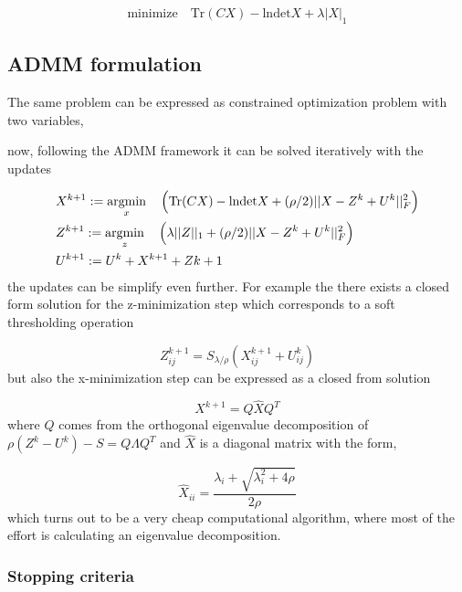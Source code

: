 \begin{equation}
\mbox{minimize}\quad \textrm{Tr}(CX)-\textrm{lndet} X+ \lambda |X|_1
\end{equation}

\subsection{ADMM formulation}

The same problem can be expressed as constrained optimization problem with two variables,

now, following the ADMM framework it can be solved iteratively with the updates

\begin{align*}
&X^{k+1} := \operatorname*{argmin}_x \quad\Big(\textrm{Tr}(CX)-\textrm{lndet}X+(\rho/2)||X-Z^k+U^k||_F^2\Big)\\
&Z^{k+1} := \operatorname*{argmin}_z\quad \Big(\lambda||Z||_1+(\rho/2)||X-Z^k+U^k||_F^2\Big)\\
&U^{k+1} := U^k + X^{k+1}+Z{k+1}
\end{align*}
the updates can be simplify even further. For example the there exists a closed form solution for the z-minimization step which corresponds to a soft thresholding operation \cite[p.~23]{convexanalysis}

\begin{equation*}
	Z_{ij}^{k+1} = S_{\lambda/\rho}(X^{k+1}_{ij}+U^k_{ij})
\end{equation*}
but also the x-minimization step can be expressed as a closed from solution \cite[p.~47]{ADMM}

\begin{equation*}
X^{k+1} = Q\hat{X}Q^T
\end{equation*}
where $Q$ comes from the orthogonal eigenvalue decomposition of $\rho(Z^k-U^k)-S=Q\Lambda Q^T$ and $\hat{X}$ is a diagonal matrix with the form,

\begin{equation*}
	\hat{X}_{ii} = \frac{\lambda_i+\sqrt{\lambda_i^2+4\rho}}{2\rho}
\end{equation*}
which turns out to be a very cheap computational algorithm, where most of the effort is calculating an eigenvalue decomposition.


\subsubsection{Stopping criteria}

